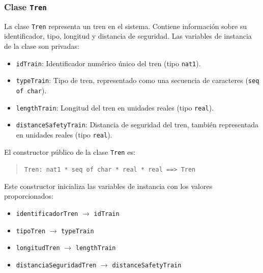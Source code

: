 \documentclass[journal]{IEEEtran}
\begin{document}
    \subsubsection*{Clase \texttt{Tren}}

    La clase \texttt{Tren} representa un tren en el sistema. Contiene información sobre su identificador, tipo, longitud y distancia de seguridad. Las variables de instancia de la clase son privadas:

    \begin{itemize}
    \item \texttt{idTrain}: Identificador numérico único del tren (tipo \texttt{nat1}).
    \item \texttt{typeTrain}: Tipo de tren, representado como una secuencia de caracteres (\texttt{seq of char}).
    \item \texttt{lengthTrain}: Longitud del tren en unidades reales (tipo \texttt{real}).
    \item \texttt{distanceSafetyTrain}: Distancia de seguridad del tren, también representada en unidades reales (tipo \texttt{real}).
    \end{itemize}

    El constructor público de la clase \texttt{Tren} es:

    \begin{quote}
    \texttt{Tren: nat1 * seq of char * real * real \texttt{==>} Tren}
    \end{quote}

    Este constructor inicializa las variables de instancia con los valores proporcionados:

    \begin{itemize}
    \item \texttt{identificadorTren} $\rightarrow$ \texttt{idTrain}
    \item \texttt{tipoTren} $\rightarrow$ \texttt{typeTrain}
    \item \texttt{longitudTren} $\rightarrow$ \texttt{lengthTrain}
    \item \texttt{distanciaSeguridadTren} $\rightarrow$ \texttt{distanceSafetyTrain}
    \end{itemize}




\sloppy

\end{document}
